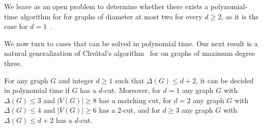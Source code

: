 We leave as an open problem to determine whether there exists a  polynomial-time algorithm for  for graphs of diameter at most two for every $d \geq 2$, as it is the case for $d=1$~\cite{matching_cut_diameter}.





\medskip

We now turn to cases that can be solved in polynomial time. Our next result is a natural generalization of Chvátal's algorithm~\cite{chvatal_matching_cut} for  on graphs of maximum degree three.

\begin{theorem}
    \label{thm:small_deg_poly}
    For any graph $G$ and integer $d \geq 1$ such that $\Delta(G) \leq d+2$, it can be decided in polynomial time if $G$ has a $d$-cut. Moreover, for $d=1$ any graph $G$ with $\Delta(G) \leq 3$ and $|V(G)| \geq 8$ has a matching cut, for $d=2$ any graph $G$ with $\Delta(G) \leq 4$ and $|V(G)| \geq 6$ has a $2$-cut, and for $d\geq 3$ any graph $G$ with $\Delta(G) \leq d+2$ has a $d$-cut.
\end{theorem}

